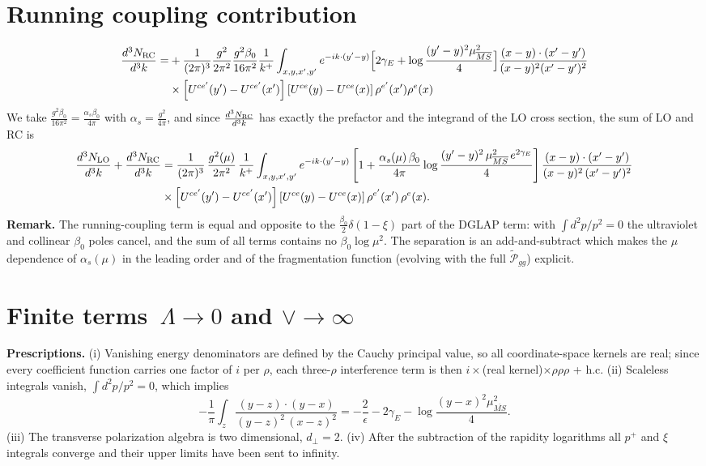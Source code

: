 \documentclass[9pt]{article}
\numberwithin{equation}{section}
\begin{document}
\section{Running coupling contribution}
\begin{align}
\frac{d^{3}N_{\rm RC}}{d^{3}k}= & +\frac{1}{(2\pi)^{3}}\frac{g^{2}}{2\pi^{2}}\frac{g^{2}\beta_{0}}{16\pi^{2}}\frac{1}{k^{+}}\int_{x,y,x',y'}e^{-ik\cdot(y'-y)}\Big[2\gamma_{E}+\log\frac{(y'-y)^{2}\mu^{2}_{\overline{MS}}}{4}\Big]\frac{(x-y)\cdot(x'-y')}{(x-y)^{2}(x'-y')^{2}}\notag\\
&\times\left[U^{ce'}(y') - U^{ce'}(x')\right]\left[U^{ce}(y) - U^{ce}(x)\right]\rho^{e'}(x')\rho^{e}(x)
\end{align}
We take $\frac{g^{2}\beta_{0}}{16\pi^{2}}=\frac{\alpha_{s}\beta_{0}}{4\pi}$ with $\alpha_{s}=\frac{g^{2}}{4\pi}$, and since $\frac{d^{3}N_{\rm RC}}{d^{3}k}$ has exactly the prefactor and the integrand of the LO cross section, the sum of LO and RC is
\begin{align}
\frac{d^{3}N_{\rm LO}}{d^{3}k}+\frac{d^{3}N_{\rm RC}}{d^{3}k}&=\frac{1}{(2\pi)^{3}}\,\frac{g^{2}(\mu)}{2\pi^{2}}\,\frac{1}{k^{+}}\int_{x,y,x',y'}e^{-ik\cdot(y'-y)}\left[1+\frac{\alpha_{s}(\mu)\,\beta_{0}}{4\pi}\log\frac{(y'-y)^{2}\,\mu^{2}_{\overline{MS}}\,e^{2\gamma_{E}}}{4}\right]\frac{(x-y)\cdot(x'-y')}{(x-y)^{2}\,(x'-y')^{2}}\notag\\
&\times\left[U^{ce'}(y')-U^{ce'}(x')\right]\left[U^{ce}(y)-U^{ce}(x)\right]\rho^{e'}(x')\,\rho^{e}(x).
\end{align}
\noindent\textbf{Remark.} The running-coupling term is equal and opposite to the $\frac{\beta_{0}}{2}\delta(1-\xi)$ part of the DGLAP term: with $\int d^{2}p/p^{2}=0$ the ultraviolet and collinear $\beta_{0}$ poles cancel, and the sum of all terms contains no $\beta_{0}\log\mu^{2}$. The separation is an add-and-subtract which makes the $\mu$ dependence of $\alpha_{s}(\mu)$ in the leading order and of the fragmentation function (evolving with the full $\widetilde{\mathcal P}_{gg}$) explicit.
\section{Finite terms\, $\Lambda \to 0$ and $\vee\to \infty $}
\noindent\textbf{Prescriptions.} (i) Vanishing energy denominators are defined by the Cauchy principal value, so all coordinate-space kernels are real; since every coefficient function carries one factor of $i$ per $\rho$, each three-$\rho$ interference term is then $i\times$(real kernel)$\times\rho\rho\rho$ + h.c. (ii) Scaleless integrals vanish, $\int d^{2}p/p^{2}=0$, which implies
\begin{equation}
-\frac{1}{\pi}\int_{z}\frac{(y-z)\cdot(y-x)}{(y-z)^{2}\,(x-z)^{2}}=-\frac{2}{\epsilon}-2\gamma_{E}-\log\frac{(y-x)^{2}\mu^{2}_{\overline{MS}}}{4}.\label{eq:Lid}
\end{equation}
(iii) The transverse polarization algebra is two dimensional, $d_{\perp}=2$. (iv) After the subtraction of the rapidity logarithms all $p^{+}$ and $\xi$ integrals converge and their upper limits have been sent to infinity.
\end{document}
